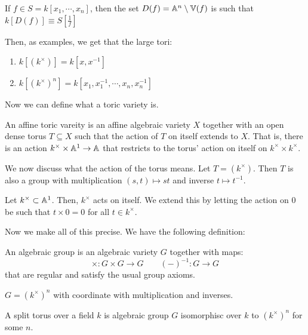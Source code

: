 \documentclass[12pt]{article}
\begin{document}
\begin{lemma}
    If $f \in S = k[x_1, \cdots, x_n]$, then the set $D(f) = \mathbb A^n \setminus \mathbb V(f)$ is such that $k[D(f)] \equiv S\left[\frac{1}{f}\right]$
\end{lemma}

Then, as examples, we get that the large tori:
\begin{enumerate}
    \item $k[(k^\times)] = k[x, x^{-1}]$
    \item $k[(k^\times)^n] = k[x_1, x_1^{-1}, \cdots, x_n, x_n^{-1}]$
\end{enumerate}

Now we can define what a toric variety is. 
\begin{definition}
    An affine toric vareity is an affine algebraic variety $X$ together with an open dense torus $T \subseteq X$ such that the action of $T$ on itself extends to $X$. That is, there is an action $k^\times \times \mathbb A^1 \to \mathbb A$ that restricts to the torus' action on itself on $k^\times \times k^\times$. 
\end{definition}

We now discuss what the action of the torus means. Let $T = (k^\times)$. Then $T$ is also a group with multiplication $(s,t) \mapsto st$ and inverse $t \mapsto t^{-1}$.

\begin{example}
    Let $k^\times \subset \mathbb A^1$. Then, $k^\times$ acts on itself. We extend this by letting the action on $0$ be such that $t \times 0 = 0$ for all $t \in k^\times$. 
\end{example}

Now we make all of this precise. We have the following definition:
\begin{definition}
    An algebraic group is an algebraic variety $G$ together with maps: 
    \[ \times: G \times G \to G \qquad (-)^{-1}: G \to G\]
    that are regular and satisfy the usual group axioms.
\end{definition}

\begin{example}
    $G = (k^\times)^n$ with coordinate with multiplication and inverses. 
\end{example}

\begin{definition}
    A split torus over a field $k$ is algebraic group $G$ isomorphisc over $k$ to $(k^\times)^n$ for some $n$. 
\end{definition}
\end{document}
